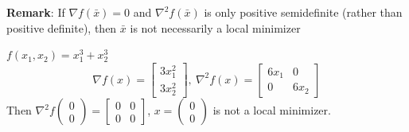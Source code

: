 \documentclass[11pt]{article}
\numberwithin{equation}{section}
\begin{document}
\textbf{Remark}: If $\nabla f(\bar{x})=0$ and $\nabla^2 f(\bar{x})$ is only positive semidefinite (rather than positive definite), then $\bar{x}$ is not necessarily a local minimizer
\begin{example}
    $f\left(x_{1}, x_{2}\right)=x_{1}^{3}+x_{2}^{3}$
    $$\nabla f(x)=\left[\begin{array}{l}
        3 x_{1}^{2} \\
        3 x_{2}^{2}
        \end{array}\right], \ \nabla^{2} f(x)=\left[\begin{array}{ll}
            6 x_{1} & 0 \\
            0 & 6 x_{2}
            \end{array}\right] $$
    Then $\nabla^{2} f\left(\begin{array}{l}0 \\ 0\end{array}\right)=\left[\begin{array}{ll}
        0 & 0 \\
        0 & 0
        \end{array}\right]$, $x=\left(\begin{array}{l}0 \\ 0\end{array}\right)$ is not a local minimizer.
\end{example}
\end{document}
